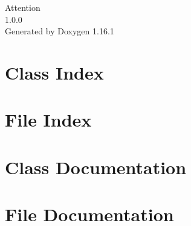 \documentclass[twoside]{book}
\newcommand{\+}{\discretionary{\mbox{\scriptsize$\hookleftarrow$}}{}{}}
\newcommand{\clearemptydoublepage}{%
    \newpage{\pagestyle{empty}\cleardoublepage}%
  }
\begin{document}
  \raggedbottom
    \hypersetup{pageanchor=false,
                bookmarksnumbered=true,
                pdfencoding=unicode
               }
  \begin{titlepage}
  \vspace*{7cm}
  \begin{center}%
  {\Large Attention}\\
  [1ex]\large 1.\+0.\+0 \\
  \vspace*{1cm}
  {\large Generated by Doxygen 1.16.1}\\
  \end{center}
  \end{titlepage}
  \clearemptydoublepage
  \tableofcontents
  \clearemptydoublepage
  \hypersetup{pageanchor=true}
\chapter{Class Index}

\chapter{File Index}

\chapter{Class Documentation}



\chapter{File Documentation}






  \backmatter
  \newpage
  \clearemptydoublepage
  \printindex
\end{document}
